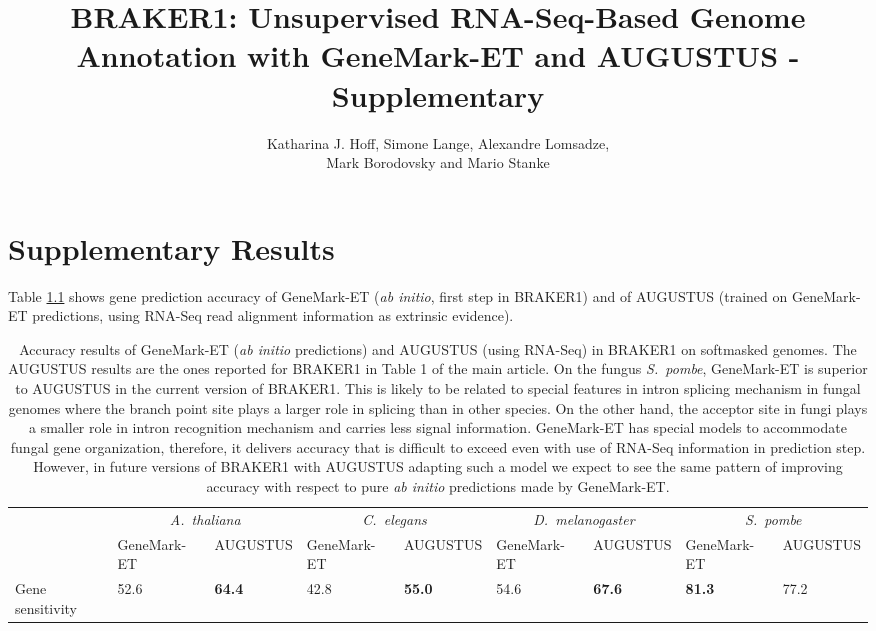 \documentclass[a4paper,10pt]{report}
\title{BRAKER1: Unsupervised RNA-Seq-Based Genome Annotation with GeneMark-ET and AUGUSTUS - \textbf{Supplementary}}
\author{Katharina J. Hoff, Simone Lange, Alexandre Lomsadze,\\ Mark Borodovsky and Mario Stanke}
\begin{document}
\maketitle

\tableofcontents

\chapter{Supplementary Results}



Table \ref{compare} shows  gene prediction accuracy of GeneMark-ET (\textit{ab initio}, first step in BRAKER1) and of AUGUSTUS (trained on GeneMark-ET predictions, using RNA-Seq read alignment information as extrinsic evidence).

\begin{table}
\caption{Accuracy results of GeneMark-ET (\textit{ab initio} predictions) and AUGUSTUS (using RNA-Seq) in BRAKER1 on softmasked genomes.
The AUGUSTUS results are the ones reported for BRAKER1 in Table 1 of the main article. On the fungus \textit{S.~pombe}, GeneMark-ET is superior to AUGUSTUS in the current version of BRAKER1. This is likely to be related to special features in intron splicing mechanism in fungal genomes where the branch point site plays a larger role in splicing than in other species. On the other hand, the acceptor site in fungi plays a smaller role in intron recognition mechanism and carries less signal information. GeneMark-ET has special models to accommodate fungal gene organization, therefore, it delivers accuracy that is difficult to exceed even with use of RNA-Seq information in prediction step. However, in future versions of BRAKER1 with AUGUSTUS adapting such a model we expect to see the same pattern of improving accuracy with respect to pure \textit{ab initio} predictions made by GeneMark-ET. \label{compare}}
\begin{tabular}{lp{1.5cm}p{1.2cm}p{1.5cm}p{1.2cm}p{1.5cm}p{1.2cm}p{1.5cm}p{1.2cm}}\hline
 & \multicolumn{2}{c}{\textit{A.~thaliana}} &  \multicolumn{2}{c}{\textit{C.~elegans}} &  \multicolumn{2}{c}{\textit{D.~melanogaster}} &  \multicolumn{2}{c}{\textit{S.~pombe}}\\
 & \tiny{GeneMark-ET} & \tiny{AUGUSTUS} & \tiny{GeneMark-ET} & \tiny{AUGUSTUS} &  \tiny{GeneMark-ET} & \tiny{AUGUSTUS} & \tiny{GeneMark-ET} &\tiny{AUGUSTUS}\\
 \hline
Gene sensitivity        & 52.6 & \textbf{64.4} & 42.8 & \textbf{55.0} & 54.6 & \textbf{67.6} & \textbf{81.3} & 77.2\\

\end{tabular}
\end{table}
\end{document}
